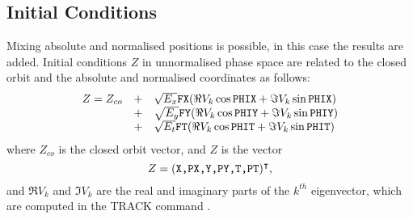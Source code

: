 \subsection{Initial Conditions}
Mixing absolute and normalised positions is possible,
in this case the results are added.
Initial conditions $Z$ in unnormalised phase space are related
to the closed orbit and the absolute and normalised coordinates as follows:
\[
\begin{array}{rcl}
  Z = Z_{co}&+& \sqrt{E_x} \hbox{\tt FX}
  (\Re V_k \cos \hbox{\tt PHIX} + \Im V_k \sin \hbox{\tt PHIX}) \\
  &+& \sqrt{E_y} \hbox{\tt FY}
  (\Re V_k \cos \hbox{\tt PHIY} + \Im V_k \sin \hbox{\tt PHIY}) \\
  &+& \sqrt{E_t} \hbox{\tt FT}
  (\Re V_k \cos \hbox{\tt PHIT} + \Im V_k \sin \hbox{\tt PHIT})
\end{array}
\]
where $Z_{co}$ is the closed orbit vector, and $Z$ is the vector
\[
Z = (\texttt{X,PX,Y,PY,T,PT})^\intercal,
\]
and $\Re V_k$ and $\Im V_k$ are the real and imaginary parts of the
$k^{th}$ eigenvector,
which are computed in the {TRACK} command .



